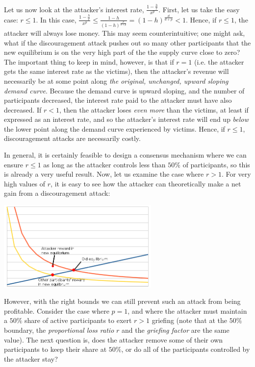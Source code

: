\documentclass[12pt]{article}
\begin{document}
Let us now look at the attacker's interest rate, $\frac{1-\frac{h}{r}}{x^p}$. First, let us take the easy case: $r \le 1$. In this case, $\frac{1-\frac{h}{r}}{x^p} \le \frac{1-h}{(1-h)^{\frac{p}{d+p}}} = (1-h)^{\frac{d}{d+p}} < 1$. Hence, if $r \le 1$, the attacker will always lose money. This may seem counterintuitive; one might ask, what if the discouragement attack pushes out so many other participants that the new equilibrium is on the very high part of the the supply curve close to zero? The important thing to keep in mind, however, is that if $r = 1$ (i.e. the attacker gets the same interest rate as the victims), then the attacker's revenue will necessarily be at some point along \textit{the original, unchanged, upward sloping demand curve}. Because the demand curve is upward sloping, and the number of participants decreased, the interest rate paid to the attacker must have also decreased. If $r < 1$, then the attacker loses \textit{even more} than the victims, at least if expressed as an interest rate, and so the attacker's interest rate will end up \textit{below} the lower point along the demand curve experienced by victims. Hence, if $r \le 1$, discouragement attacks are necessarily costly.

In general, it is certainly feasible to design a consensus mechanism where we can ensure $r \le 1$ as long as the attacker controls less than $50\%$ of participants, so this is already a very useful result. Now, let us examine the case where $r > 1$. For very high values of $r$, it is easy to see how the attacker can theoretically make a net gain from a discouragement attack:

\includegraphics[width=300px]{disc_chart3.png}



However, with the right bounds we can still prevent such an attack from being profitable. Consider the case where $p=1$, and where the attacker must maintain a $50\%$ share of active participants to exert $r > 1$ griefing (note that at the $50\%$ boundary, the \textit{proportional loss ratio} $r$ and the \textit{griefing factor} are the same value). The next question is, does the attacker remove some of their own participants to keep their share at $50\%$, or do all of the participants controlled by the attacker stay?
\end{document}
